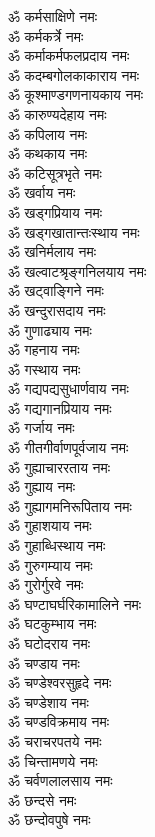 \begin{multicols}{2}
\begin{flushleft}
ॐ कर्मसाक्षिणे नमः\\
ॐ कर्मकर्त्रे नमः\\
ॐ कर्माकर्मफलप्रदाय नमः\\
ॐ कदम्बगोलकाकाराय नमः\\
ॐ कूश्माण्डगणनायकाय नमः\\
ॐ कारुण्यदेहाय नमः\\
ॐ कपिलाय नमः\\
ॐ कथकाय नमः\\
ॐ कटिसूत्रभृते नमः\\
ॐ खर्वाय नमः\hfill{}\\
ॐ खड्गप्रियाय नमः\\
ॐ खड्गखातान्तःस्थाय नमः\\
ॐ खनिर्मलाय नमः\\
ॐ खल्वाटश्रृङ्गनिलयाय नमः\\
ॐ खट्वाङ्गिने नमः\\
ॐ खन्दुरासदाय नमः\\
ॐ गुणाढ्याय नमः\\
ॐ गहनाय नमः\\
ॐ गस्थाय नमः\\
ॐ गद्यपद्यसुधार्णवाय नमः\hfill{}\\
ॐ गद्यगानप्रियाय नमः\\
ॐ गर्जाय नमः\\
ॐ गीतगीर्वाणपूर्वजाय नमः\\
ॐ गुह्याचाररताय नमः\\
ॐ गुह्याय नमः\\
ॐ गुह्यागमनिरूपिताय नमः\\
ॐ गुहाशयाय नमः\\
ॐ गुहाब्धिस्थाय नमः\\
ॐ गुरुगम्याय नमः\\
ॐ गुरोर्गुरवे नमः\hfill{}\\
ॐ घण्टाघर्घरिकामालिने नमः\\
ॐ घटकुम्भाय नमः\\
ॐ घटोदराय नमः\\
ॐ चण्डाय नमः\\
ॐ चण्डेश्वरसुहृदे नमः\\
ॐ चण्डेशाय नमः\\
ॐ चण्डविक्रमाय नमः\\
ॐ चराचरपतये नमः\\
ॐ चिन्तामणये नमः\\
ॐ चर्वणलालसाय नमः\hfill{}\\
ॐ छन्दसे नमः\\
ॐ छन्दोवपुषे नमः\\

\end{flushleft}
\end{multicols}
